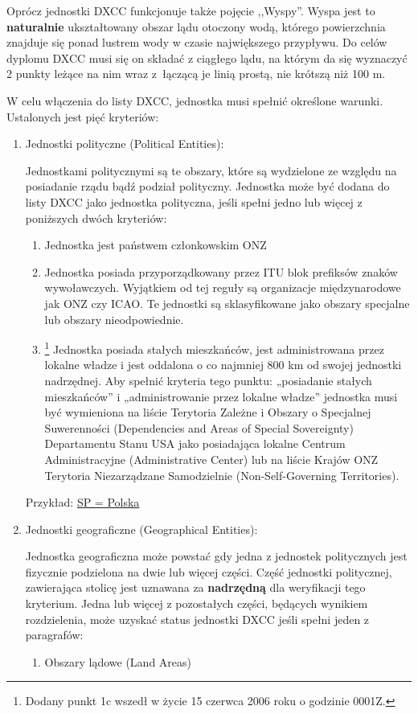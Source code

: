 \documentclass[]{mgr}
\begin{document}
            Oprócz jednostki DXCC funkcjonuje także pojęcie ,,Wyspy''. Wyspa jest to \textbf{naturalnie} ukształtowany obszar lądu otoczony wodą, którego powierzchnia znajduje się ponad lustrem wody w czasie największego przypływu. Do celów dyplomu DXCC musi się on składać z ciągłego lądu, na którym da się wyznaczyć 2 punkty leżące na nim wraz z~łączącą je linią prostą, nie krótszą niż 100 m. 

            W celu włączenia do listy DXCC, jednostka musi spełnić określone warunki. Ustalonych jest pięć kryteriów:
            \begin{enumerate}
                \item Jednostki polityczne (Political Entities):

                Jednostkami politycznymi są te obszary, które są wydzielone ze względu na posiadanie rządu bądź podział polityczny. Jednostka może być dodana do listy DXCC jako jednostka polityczna, jeśli spełni jedno lub więcej z poniższych dwóch kryteriów: 
                \begin{enumerate}
                    \item Jednostka jest państwem członkowskim ONZ
                    \item Jednostka posiada przyporządkowany przez ITU blok prefiksów znaków wywoławczych. Wyjątkiem od tej reguły są organizacje międzynarodowe jak ONZ czy ICAO. Te jednostki są sklasyfikowane jako obszary specjalne lub obszary nieodpowiednie.
                    \item\footnote{Dodany punkt 1c wszedł w życie 15 czerwca 2006 roku o godzinie 0001Z.} Jednostka posiada stałych mieszkańców, jest administrowana przez lokalne władze i jest oddalona o co najmniej 800 km od swojej jednostki nadrzędnej. Aby spełnić kryteria tego punktu: „posiadanie stałych mieszkańców” i „administrowanie przez lokalne władze” jednostka musi być wymieniona na liście Terytoria Zależne i Obszary o Specjalnej Suwerenności (Dependencies and Areas of Special Sovereignty) Departamentu Stanu USA jako posiadająca lokalne Centrum Administracyjne (Administrative Center) lub na liście Krajów ONZ Terytoria Niezarządzane Samodzielnie (Non-Self-Governing Territories).
                \end{enumerate}
                Przykład: \underline{SP = Polska}
                \item Jednostki geograficzne (Geographical Entities):

                Jednostka geograficzna może powstać gdy jedna z jednostek politycznych jest fizycznie podzielona na dwie lub więcej części. Część jednostki politycznej, zawierająca stolicę jest uznawana za \textbf{nadrzędną} dla weryfikacji tego kryterium. Jedna lub więcej z pozostałych części, będących wynikiem rozdzielenia, może uzyskać status jednostki DXCC jeśli spełni jeden z paragrafów:
                \begin{enumerate}
                    \item Obszary lądowe (Land Areas)


\end{enumerate}
\end{enumerate}
\end{document}
